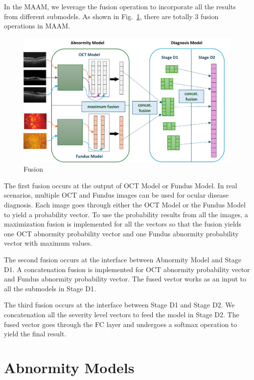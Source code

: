 \documentclass{article}
\begin{document}
	\vspace{0.5cm}
	
	In the MAAM, we leverage the fusion operation to incorporate all the results from different submodels. As shown in Fig.~\ref{fig:fusion}, there are totally 3 fusion operations in MAAM.
	
	\begin{figure}[htbp]
		\centering
		\includegraphics[width=\linewidth]{Figs/fusion.pdf}
		\caption{Fusion}
		\vspace{0.3cm}
		\label{fig:fusion}
	\end{figure}

	The first fusion occurs at the output of OCT Model or Fundus Model. In real scenarios, multiple OCT and Fundus images can be used for ocular disease diagnosis. Each image goes through either the OCT Model or the Fundus Model to yield a probability vector. To use the probability results from all the images, a maximization fusion is implemented for all the vectors so that the fusion yields one OCT abnormity probability vector and one Fundus abnormity probability vector with maximum values.
	
	The second fusion occurs at the interface between Abnormity Model and Stage D1. A concatenation fusion is implemented for OCT abnormity probability vector and Fundus abnormity probability vector. The fused vector works as an input to all the submodels in Stage D1.
	
	The third fusion occurs at the interface between Stage D1 and Stage D2. We concatenation all the severity level vectors to feed the model in Stage D2. The fused vector goes through the FC layer and undergoes a softmax operation to yield the final result.
	
	\section{Abnormity Models}
	
\end{document}
